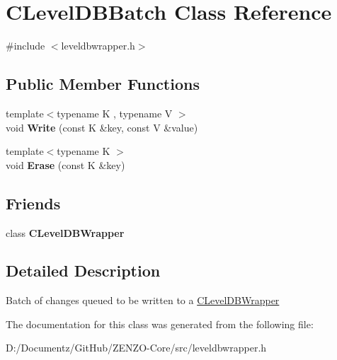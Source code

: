 \hypertarget{class_c_level_d_b_batch}{}\section{C\+Level\+D\+B\+Batch Class Reference}
\label{class_c_level_d_b_batch}


{\ttfamily \#include $<$leveldbwrapper.\+h$>$}

\subsection*{Public Member Functions}
\begin{DoxyCompactItemize}
\item 
\mbox{\label{class_c_level_d_b_batch_ab459da1abafa27e834de9a4cc25b6f2d}} 
{\footnotesize template$<$typename K , typename V $>$ }\\void {\bfseries Write} (const K \&key, const V \&value)
\item 
\mbox{\label{class_c_level_d_b_batch_a22bf093d560b4ce3333e8f4a947faa7f}} 
{\footnotesize template$<$typename K $>$ }\\void {\bfseries Erase} (const K \&key)
\end{DoxyCompactItemize}
\subsection*{Friends}
\begin{DoxyCompactItemize}
\item 
\mbox{\label{class_c_level_d_b_batch_acbe5e6be88c5bccb0ec229ebc91dde82}} 
class {\bfseries C\+Level\+D\+B\+Wrapper}
\end{DoxyCompactItemize}


\subsection{Detailed Description}
Batch of changes queued to be written to a \mbox{\hyperlink{class_c_level_d_b_wrapper}{C\+Level\+D\+B\+Wrapper}} 

The documentation for this class was generated from the following file\+:\begin{DoxyCompactItemize}
\item 
D\+:/\+Documentz/\+Git\+Hub/\+Z\+E\+N\+Z\+O-\/\+Core/src/leveldbwrapper.\+h\end{DoxyCompactItemize}
